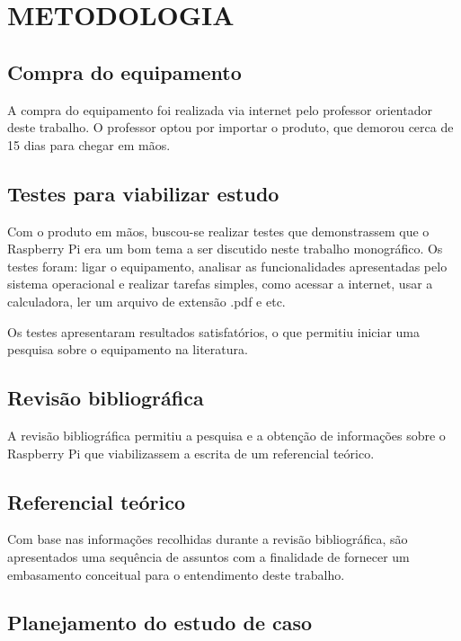 \chapter{METODOLOGIA}

\section{Compra do equipamento}

A compra do equipamento foi realizada via internet pelo professor orientador deste trabalho. O professor optou por importar o produto, que demorou cerca de 15 dias para chegar em mãos.

\section{Testes para viabilizar estudo}

Com o produto em mãos, buscou-se realizar testes que demonstrassem que o Raspberry Pi era um bom tema a ser discutido neste trabalho monográfico. Os testes foram: ligar o equipamento, analisar as funcionalidades apresentadas pelo sistema operacional e realizar tarefas simples, como acessar a internet, usar a calculadora, ler um arquivo de extensão .pdf e etc.

Os testes apresentaram resultados satisfatórios, o que permitiu iniciar uma pesquisa sobre o equipamento na literatura.

\section{Revisão bibliográfica}

A revisão bibliográfica permitiu a pesquisa e a obtenção de informações sobre o Raspberry Pi que viabilizassem a escrita de um referencial teórico.

\section{Referencial teórico}

Com base nas informações recolhidas durante a revisão bibliográfica, são apresentados uma sequência de assuntos com a finalidade de fornecer um embasamento conceitual para o entendimento deste trabalho.

\section{Planejamento do estudo de caso}

